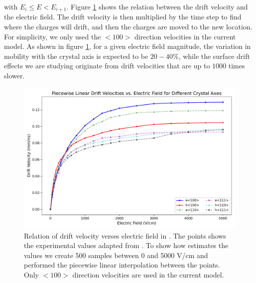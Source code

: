 \noindent
with $E_i \le E < E_{i+1}$. Figure \ref{ch3_fig_dv_vs_e} shows the relation between the drift velocity and the electric field. The drift velocity is then multiplied by the time step to find where the charges will drift, and then the charges are moved to the new location. For simplicity, we only used the $<100>$ direction velocities in the current model. As shown in figure \ref{ch3_fig_dv_vs_e}, for a given electric field magnitude, the variation in mobility with the crystal axis is expected to be $20-40\%$, while the surface drift effects we are studying originate from drift velocities that are up to $1000$ times slower.

\begin{figure}[!htb]
    \includegraphics[trim={0cm 0 0cm 0},clip,width=0.99\linewidth]{ch3/figs/ehd_dv_e.pdf}
    \caption{Relation of drift velocity verses electric field in {\ehd}. The points shows the experimental values adapted from \cite{OMAR19871351}. To show how {\ehd} estimates the values we create 500 samples between 0 and 5000 V/cm and performed the piecewise linear interpolation between the points. Only $<100>$ direction velocities are used in the current model.}
    \label{ch3_fig_dv_vs_e}
\end{figure}

